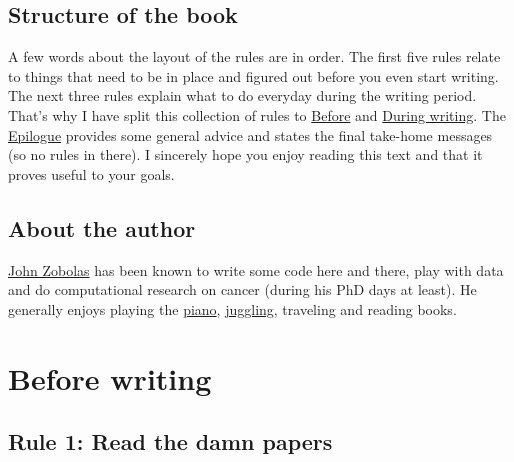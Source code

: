 \documentclass[
  12pt,
]{book}
\begin{document}
\hypertarget{structure-of-the-book}{%
\section*{Structure of the book}\label{structure-of-the-book}}

A few words about the layout of the rules are in order.
The first five rules relate to things that need to be in place and figured out before you even start writing.
The next three rules explain what to do everyday during the writing period.
That's why I have split this collection of rules to \protect\hyperlink{before}{Before} and \protect\hyperlink{during}{During writing}.
The \protect\hyperlink{epilogue}{Epilogue} provides some general advice and states the final take-home messages (so no rules in there).
I sincerely hope you enjoy reading this text and that it proves useful to your goals.

\hypertarget{about-the-author}{%
\section*{About the author}\label{about-the-author}}

\href{https://github.com/bblodfon}{John Zobolas} has been known to write some code here and there, play with data and do computational research on cancer (during his PhD days at least).
He generally enjoys playing the \href{https://www.youtube.com/c/JohnZobolas}{piano}, \href{https://www.instagram.com/bblodfon312/}{juggling}, traveling and reading books.

\hypertarget{before}{%
\chapter*{Before writing}\label{before}}

\hypertarget{rule1}{%
\section*{\texorpdfstring{\textbf{Rule 1:} Read the damn papers}{Rule 1: Read the damn papers}}\label{rule1}}
\end{document}
